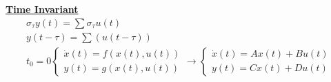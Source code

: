         {\centering\textbf{\underline{Time Invariant}}}
        \begin{align*}
            \sigma_{\tau} y(t) = \sum \sigma_{\tau} u(t)\\
            y(t - \tau) = \sum(u(t - \tau))\\
            t_0 = 0
            \begin{cases}
                \dot{x}(t) = f(x(t), u(t))\\
                y(t) = g(x(t), u(t))
            \end{cases}
            \rightarrow
            \begin{cases}
                \dot{x}(t) = Ax(t) + Bu(t)\\
                y(t) = Cx(t) + Du(t)
            \end{cases}
        \end{align*}